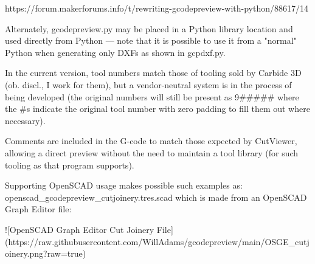 \documentclass{ltxdoc}
\begin{document}
\begin{readme}
https://forum.makerforums.info/t/rewriting-gcodepreview-with-python/88617/14

Alternately, gcodepreview.py may be placed in a Python library location and used directly from Python --- note that it is possible to use it from a "normal" Python when generating only DXFs as shown in gcpdxf.py.

In the current version, tool numbers match those of tooling sold by Carbide 3D (ob. discl., I work for them), but a vendor-neutral system is in the process of being developed (the original numbers will still be present as 9##### where the #s indicate the original tool number with zero padding to fill them out where necessary). 

Comments are included in the G-code to match those expected by CutViewer, allowing a direct preview without the need to maintain a tool library (for such tooling as that program supports).

Supporting OpenSCAD usage makes possible such examples as: openscad_gcodepreview_cutjoinery.tres.scad which is made from an OpenSCAD Graph Editor file:

![OpenSCAD Graph Editor Cut Joinery File](https://raw.githubusercontent.com/WillAdams/gcodepreview/main/OSGE_cutjoinery.png?raw=true)


\end{readme}
\end{document}
